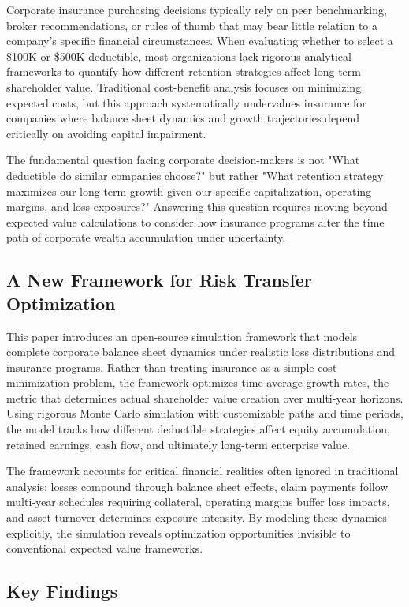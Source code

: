 \documentclass[11pt,letterpaper]{article}
\begin{document}
Corporate insurance purchasing decisions typically rely on peer benchmarking, broker recommendations, or rules of thumb that may bear little relation to a company's specific financial circumstances. When evaluating whether to select a \$100K or \$500K deductible, most organizations lack rigorous analytical frameworks to quantify how different retention strategies affect long-term shareholder value. Traditional cost-benefit analysis focuses on minimizing expected costs, but this approach systematically undervalues insurance for companies where balance sheet dynamics and growth trajectories depend critically on avoiding capital impairment.

The fundamental question facing corporate decision-makers is not "What deductible do similar companies choose?" but rather "What retention strategy maximizes our long-term growth given our specific capitalization, operating margins, and loss exposures?" Answering this question requires moving beyond expected value calculations to consider how insurance programs alter the time path of corporate wealth accumulation under uncertainty.

\subsection{A New Framework for Risk Transfer Optimization}

This paper introduces an open-source simulation framework that models complete corporate balance sheet dynamics under realistic loss distributions and insurance programs. Rather than treating insurance as a simple cost minimization problem, the framework optimizes time-average growth rates, the metric that determines actual shareholder value creation over multi-year horizons. Using rigorous Monte Carlo simulation with customizable paths and time periods, the model tracks how different deductible strategies affect equity accumulation, retained earnings, cash flow, and ultimately long-term enterprise value.

The framework accounts for critical financial realities often ignored in traditional analysis: losses compound through balance sheet effects, claim payments follow multi-year schedules requiring collateral, operating margins buffer loss impacts, and asset turnover determines exposure intensity. By modeling these dynamics explicitly, the simulation reveals optimization opportunities invisible to conventional expected value frameworks.

\subsection{Key Findings}
\end{document}
